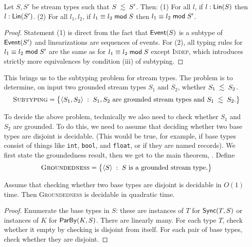 \begin{proposition}
\label{prop:stream-relaxation-lin}
\label{45:prop:schema-relaxation-flattening}
Let $S, S'$ be stream types such that $S \; \lesssim \; S'$. Then:
(1) For all $l$, if $l: \mathsf{Lin}({S})$ then $l: \mathsf{Lin}({S'})$.
(2) For all $l_1, l_2$, if $l_1 \equiv l_2 \;\mathsf{mod}\; {S}$ then $l_1 \equiv l_2 \;\mathsf{mod}\; {S'}$.
\end{proposition}
\begin{proof}
Statement (1) is direct from the fact that $\mathsf{Event}(S)$ is a subtype of $\mathsf{Event}(S')$
and linearizations are sequences of events.
For (2), all typing rules for $l_1 \equiv l_2 \;\mathsf{mod}\; {S'}$ are the same as for $l_1 \equiv l_2 \;\mathsf{mod}\; {S}$ except \textsc{Indep}, which introduces strictly more equivalences by condition (iii) of subtyping.
\end{proof}

This brings us to the subtyping problem for stream types. The problem is to determine, on input two grounded stream types $S_1$ and $S_2$, whether $S_1 \; \lesssim \; S_2$.
\[
\textsc{Subtyping}
= \big\{ \langle S_1, S_2 \rangle \;:\; S_1, S_2 \text{ are grounded stream types and } S_1 \; \lesssim \; S_2. \big\}
\]

To decide the above problem, technically we also need to check whether $S_1$ and $S_2$ are grounded. To do this, we need to assume that deciding whether two base types are disjoint is decidable.
(This would be true, for example, if base types consist of things like \texttt{int}, \texttt{bool}, and \texttt{float}, or if they are named records).
We first state the groundedness result, then we get to the main theorem, .
Define
\[
\textsc{Groundedness}
= \big\{ \langle S \rangle \;:\; S \text{ is a grounded stream type}. \big\}
\]

\begin{proposition}
Assume that checking whether two base types are disjoint is decidable in $O(1)$ time.
Then \textsc{Groundedness} is decidable in quadratic time.
\end{proposition}
\begin{proof}
Enumerate the base types in $S$: these are instances of $T$ for $\mathsf{Sync}({T}, S)$ or instances of $K$ for $\mathsf{ParBy}({K}, S)$. There are linearly many.
For each type $T$, check whether it empty by checking is disjoint from itself.
For each pair of base types, check whether they are disjoint.
\end{proof}

